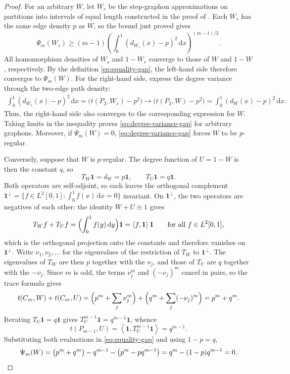 \documentclass[11pt]{article}
\theoremstyle{remark}
\numberwithin{equation}{section}
\newcommand{\one}{\mathbf 1}
\newcommand{\ip}[2]{\left\langle #1,#2\right\rangle}
\newcommand{\dd}{\,\mathrm d}
\newcommand{\tC}[2]{t(C_{#1},#2)}
\newcommand{\tP}[2]{t(P_{#1},#2)}
\newcommand{\Tker}[1]{T_{#1}}
\newcommand{\dW}{d_W}
\begin{document}
\begin{proof}
  For an arbitrary $W$, let $W_s$ be the step-graphon approximations on
  partitions into intervals of equal length constructed in the proof of
  . Each $W_s$ has the same edge density $p$ as
  $W$, so the bound just proved gives
  \[
    \Psi_m(W_s)\ge(m-1)
    \left(\int_0^1(d_{W_s}(x)-p)^2\dd x\right)^{(m-1)/2}.
  \]
  All homomorphism densities of $W_s$ and $1-W_s$ converge to those of
  $W$ and $1-W$, respectively. By the definition \eqref{eq:equality-gap},
  the left-hand side therefore converges to $\Psi_m(W)$.
  For the right-hand side, express the degree variance through the
  two-edge path density:
  \begin{align*}
    \int_0^1(d_{W_s}(x)-p)^2\dd x
    =\Big(\tP2{W_s}-p^2\Big)
    \longrightarrow\Big(\tP2W-p^2\Big)
    =\int_0^1(\dW(x)-p)^2\dd x.
  \end{align*}
  Thus, the right-hand side also converges to the corresponding expression
  for $W$. Taking limits in the inequality proves
  \eqref{eq:degree-variance-gap} for arbitrary graphons.
  Moreover, if $\Psi_m(W)=0$, \eqref{eq:degree-variance-gap} forces $W$ to be $p$-regular.

  Conversely, suppose that $W$ is $p$-regular.
  The degree function of $U=1-W$ is then the constant $q$, so
  \[
    \Tker W\one=\dW=p\one,
    \qquad
    \Tker U\one=q\one .
  \]
  Both operators are self-adjoint, so each leaves the orthogonal complement
  $\one^\perp=\{f\in L^2[0,1]:\int_0^1f(x)\dd x=0\}$ invariant.
  On $\one^\perp$, the two operators are negatives of each other: the identity
  $W+U\equiv1$ gives
  \[
    \Tker Wf+\Tker Uf=\Bigl(\int_0^1f(y)\dd y\Bigr)\one=\ip f\one\one
    \qquad\text{for all }f\in L^2[0,1],
  \]
  which is the orthogonal projection onto the constants and therefore vanishes on
  $\one^\perp$.
  Write $\nu_1,\nu_2,\ldots$ for the eigenvalues of the restriction of $\Tker W$ to
  $\one^\perp$.
  The eigenvalues of $\Tker W$ are then $p$ together with the $\nu_j$, and those of
  $\Tker U$ are $q$ together with the $-\nu_j$.
  Since $m$ is odd, the terms $\nu_j^m$ and $(-\nu_j)^m$ cancel in pairs, so the
  trace formula gives
  \[
    \tC mW+\tC mU
    =\Bigl(p^m+\sum_j\nu_j^m\Bigr)+\Bigl(q^m+\sum_j(-\nu_j)^m\Bigr)
    =p^m+q^m.
  \]
  Iterating $\Tker U\one=q\one$ gives $\Tker U^{m-1}\one=q^{m-1}\one$, whence
  \[
    \tP{m-1}U=\ip\one{\Tker U^{m-1}\one}=q^{m-1}.
  \]
  Substituting both evaluations in \eqref{eq:equality-gap} and using $1-p=q$,
  \[
    \Psi_m(W)
    =\bigl(p^m+q^m\bigr)-q^{m-1}-\bigl(p^m-pq^{m-1}\bigr)
    =q^m-(1-p)q^{m-1}
    =0. \qedhere
  \]
\end{proof}
\end{document}
